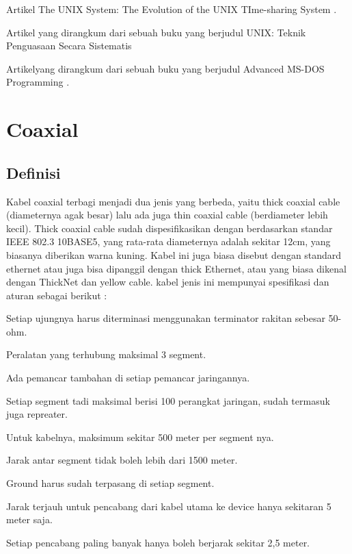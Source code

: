 	\vspace*{1cm}Artikel The UNIX System: The Evolution of the UNIX TIme-sharing System \cite{ritchie1984unix}.
	
	\vspace*{1cm}Artikel yang dirangkum dari sebuah buku yang berjudul UNIX: Teknik Penguasaan Secara Sistematis \cite{setiawanunix}
	
	\vspace*{1cm}Artikelyang dirangkum dari sebuah buku yang berjudul Advanced MS-DOS Programming \cite{duncan1988advanced}.
	

	\section{Coaxial}
		\subsection{Definisi}
		\hspace*{1cm}Kabel coaxial terbagi menjadi dua jenis yang berbeda, yaitu thick coaxial cable (diameternya agak besar) lalu ada juga thin coaxial cable (berdiameter lebih kecil). Thick coaxial cable sudah dispesifikasikan dengan berdasarkan standar IEEE 802.3 10BASE5, yang rata-rata diameternya adalah sekitar 12cm, yang biasanya diberikan warna kuning. Kabel ini juga biasa disebut dengan standard ethernet atau juga bisa dipanggil dengan thick Ethernet, atau yang biasa dikenal dengan ThickNet dan yellow cable. kabel jenis ini mempunyai spesifikasi dan aturan sebagai berikut :
		\begin{itemsize}
			\item Setiap ujungnya harus diterminasi menggunakan terminator rakitan sebesar 50-ohm.
			\item Peralatan yang terhubung maksimal 3 segment.
			\item Ada pemancar tambahan di setiap pemancar jaringannya.
			\item Setiap segment tadi maksimal berisi 100 perangkat jaringan, sudah termasuk juga repreater.
			\item Untuk kabelnya, maksimum sekitar 500 meter per segment nya.
			\item Jarak antar segment tidak boleh lebih dari 1500 meter.
			\item Ground harus sudah terpasang di setiap segment.
			\item Jarak terjauh untuk pencabang dari kabel utama ke device hanya sekitaran 5 meter saja.
			\item Setiap pencabang paling banyak hanya boleh berjarak sekitar 2,5 meter.
		\end{itemsize}
